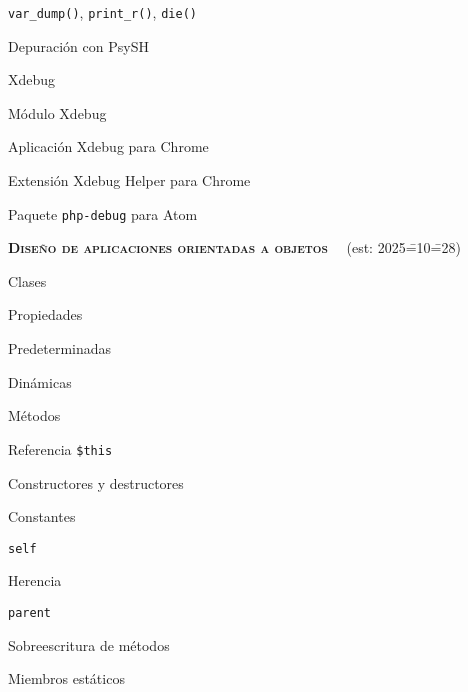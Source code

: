 \begin{longenum}
\begin{longenum}
        \begin{longenum}
            \item \texttt{var\_dump()}, \texttt{print\_r()}, \texttt{die()}
            \item Depuración con PsySH
            \item Xdebug \opcional\
            \begin{longenum}
                \item Módulo Xdebug
                \item Aplicación Xdebug para Chrome
                \item Extensión Xdebug Helper para Chrome
                \item Paquete \texttt{php-debug} para Atom
            \end{longenum}
        \end{longenum}
    \end{longenum}
    \item \textbf{\textsc{Diseño de aplicaciones orientadas a objetos}} \ \ (est: 2025\==10\==28)
    \begin{longenum}
        \item Clases
        \item Propiedades
        \begin{longenum}
            \item Predeterminadas
            \item Dinámicas
        \end{longenum}
        \item Métodos
        \begin{longenum}
            \item Referencia \texttt{\$this}
            \item Constructores y destructores
        \end{longenum}
        \item Constantes
        \begin{longenum}
            \item \texttt{self}
        \end{longenum}
        \item Herencia
        \begin{longenum}
            \item \texttt{parent}
            \item Sobreescritura de métodos
        \end{longenum}
        \item Miembros estáticos

\end{longenum}
\end{longenum}
